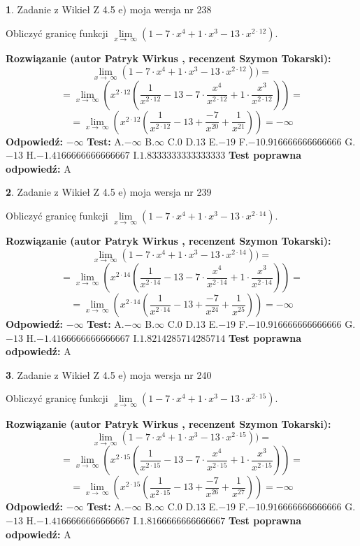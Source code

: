 \documentclass[12pt, a4paper]{article}
\theoremstyle{definition} %
\newtheorem{zad}{}
\newcommand{\zadStart}[1]{\begin{zad}#1\newline}
\newcommand{\zadStop}{\end{zad}}
\newcommand{\rozwStart}[2]{\noindent \textbf{Rozwiązanie (autor #1 , recenzent #2): }\newline}
\newcommand{\rozwStop}{\newline}
\newcommand{\odpStart}{\noindent \textbf{Odpowiedź:}\newline}
\newcommand{\odpStop}{\newline}
\newcommand{\testStart}{\noindent \textbf{Test:}\newline}
\newcommand{\testStop}{\newline}
\newcommand{\kluczStart}{\noindent \textbf{Test poprawna odpowiedź:}\newline}
\newcommand{\kluczStop}{\newline}
\begin{document}
\zadStart{Zadanie z Wikieł Z 4.5 e) moja wersja nr 238}


Obliczyć granicę funkcji  $\lim\limits_{x\to\ \infty}(1 - 7 \cdot x^{4}+1 \cdot x^{3}- 13 \cdot x^{2\cdot12})$.
\zadStop
\rozwStart{Patryk Wirkus}{Szymon Tokarski}
$$\lim\limits_{x\to\ \infty}(1 - 7 \cdot x^{4}+1 \cdot x^{3}- 13 \cdot x^{2\cdot12}))=$$
$$=\lim\limits_{x\to\ \infty}(x^{2\cdot12}(\frac{1}{x^{2\cdot12}}-13 -7 \cdot \frac{x^{4}}{x^{2\cdot12}}+1 \cdot \frac{x^{3}}{x^{2\cdot12}}))=$$
$$=\lim\limits_{x\to\ \infty}(x^{2\cdot12}(\frac{1}{x^{2\cdot12}}-13 + \frac{-7}{x^{20}}+ \frac{1}{x^{21}}))=-\infty$$
\rozwStop
\odpStart
$-\infty$
\odpStop
\testStart
A.$-\infty$ B.$\infty$ C.$0$ D.$13$ E.$-19$
F.$-10.916666666666666$ G.$-13$
H.$-1.4166666666666667$
I.$1.8333333333333333$
\testStop
\kluczStart
A
\kluczStop



\zadStart{Zadanie z Wikieł Z 4.5 e) moja wersja nr 239}


Obliczyć granicę funkcji  $\lim\limits_{x\to\ \infty}(1 - 7 \cdot x^{4}+1 \cdot x^{3}- 13 \cdot x^{2\cdot14})$.
\zadStop
\rozwStart{Patryk Wirkus}{Szymon Tokarski}
$$\lim\limits_{x\to\ \infty}(1 - 7 \cdot x^{4}+1 \cdot x^{3}- 13 \cdot x^{2\cdot14}))=$$
$$=\lim\limits_{x\to\ \infty}(x^{2\cdot14}(\frac{1}{x^{2\cdot14}}-13 -7 \cdot \frac{x^{4}}{x^{2\cdot14}}+1 \cdot \frac{x^{3}}{x^{2\cdot14}}))=$$
$$=\lim\limits_{x\to\ \infty}(x^{2\cdot14}(\frac{1}{x^{2\cdot14}}-13 + \frac{-7}{x^{24}}+ \frac{1}{x^{25}}))=-\infty$$
\rozwStop
\odpStart
$-\infty$
\odpStop
\testStart
A.$-\infty$ B.$\infty$ C.$0$ D.$13$ E.$-19$
F.$-10.916666666666666$ G.$-13$
H.$-1.4166666666666667$
I.$1.8214285714285714$
\testStop
\kluczStart
A
\kluczStop



\zadStart{Zadanie z Wikieł Z 4.5 e) moja wersja nr 240}


Obliczyć granicę funkcji  $\lim\limits_{x\to\ \infty}(1 - 7 \cdot x^{4}+1 \cdot x^{3}- 13 \cdot x^{2\cdot15})$.
\zadStop
\rozwStart{Patryk Wirkus}{Szymon Tokarski}
$$\lim\limits_{x\to\ \infty}(1 - 7 \cdot x^{4}+1 \cdot x^{3}- 13 \cdot x^{2\cdot15}))=$$
$$=\lim\limits_{x\to\ \infty}(x^{2\cdot15}(\frac{1}{x^{2\cdot15}}-13 -7 \cdot \frac{x^{4}}{x^{2\cdot15}}+1 \cdot \frac{x^{3}}{x^{2\cdot15}}))=$$
$$=\lim\limits_{x\to\ \infty}(x^{2\cdot15}(\frac{1}{x^{2\cdot15}}-13 + \frac{-7}{x^{26}}+ \frac{1}{x^{27}}))=-\infty$$
\rozwStop
\odpStart
$-\infty$
\odpStop
\testStart
A.$-\infty$ B.$\infty$ C.$0$ D.$13$ E.$-19$
F.$-10.916666666666666$ G.$-13$
H.$-1.4166666666666667$
I.$1.8166666666666667$
\testStop
\kluczStart
A
\kluczStop
\end{document}
